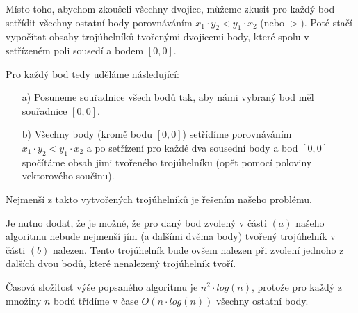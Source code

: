 \documentclass[a4paper, 12pt]{article}
\begin{document}
  Místo toho, abychom zkoušeli všechny dvojice, můžeme zkusit pro každý bod setřídit všechny ostatní body porovnáváním $x_1 \cdot y_2 < y_1 \cdot x_2$ (nebo $>$). Poté stačí vypočítat obsahy trojúhelníků tvořenými dvojicemi body, které spolu v setřízeném poli sousedí a bodem $[0,0]$.

  Pro každý bod tedy uděláme následující:
  \begin{itemize}
    \item[a)] Posuneme souřadnice všech bodů tak, aby námi vybraný bod měl souřadnice $[0,0]$.
    \item[b)] Všechny body (kromě bodu $[0,0]$) setřídíme porovnáváním $x_1 \cdot y_2 < y_1 \cdot x_2$ a po setřízení pro každé dva sousední body a bod $[0,0]$ spočítáme obsah jimi tvořeného trojúhelníku (opět pomocí poloviny vektorového součinu).
  \end{itemize}

  Nejmenší z takto vytvořených trojúhelníků je řešením našeho problému.

  Je nutno dodat, že je možné, že pro daný bod zvolený v části $(a)$ našeho algoritmu nebude nejmenší jím (a dalšími dvěma body) tvořený trojúhelník v části $(b)$ nalezen. Tento trojúhelník bude ovšem nalezen při zvolení jednoho z dalších dvou bodů, které nenalezený trojúhelník tvoří.

  Časová složitost výše popsaného algoritmu je $n^2 \cdot log(n)$, protože pro každý z množiny $n$ bodů třídíme v čase $O(n \cdot log(n))$ všechny ostatní body.
\end{document}
